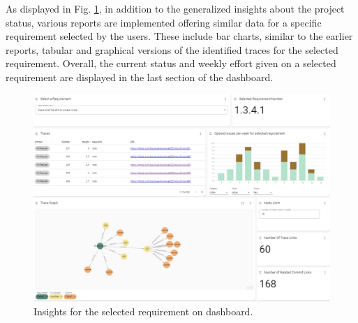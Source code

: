 As displayed in Fig. \ref{fig:perreq}, in addition to the generalized insights about the project status, various reports are implemented offering similar data for a specific requirement selected by the users. These include bar charts, similar to the earlier reports, tabular and graphical versions of the identified traces for the selected requirement. Overall, the current status and weekly effort given on a selected requirement are displayed in the last section of the dashboard.

\begin{figure}[htb]
    \centering
    \includegraphics[width=1\linewidth]{figs/perreq.jpg}
    \caption{Insights for the selected requirement on dashboard.}
    \label{fig:perreq}
\end{figure}

